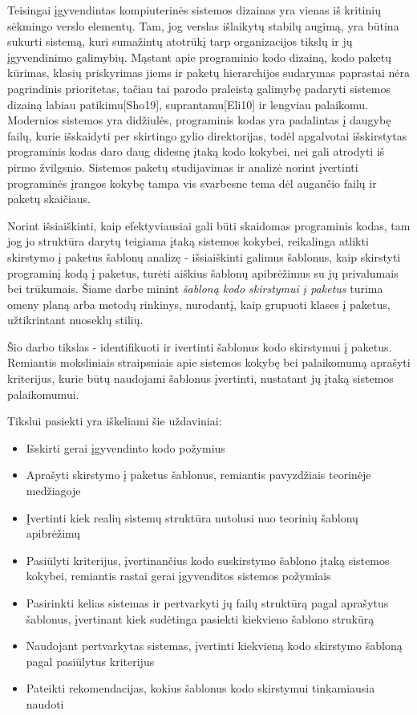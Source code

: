 Teisingai įgyvendintas kompiuterinės sistemos dizainas yra vienas iš kritinių sėkmingo verslo
elementų.
Tam, jog verslas išlaikytų stabilų augimą, yra būtina sukurti sistemą, kuri sumažintų
atotrūkį tarp organizacijos tikslų ir jų įgyvendinimo galimybių.
Mąstant apie programinio kodo
dizainą, kodo paketų kūrimas, klasių priskyrimas jiems ir paketų hierarchijos sudarymas paprastai
nėra pagrindinis prioritetas, tačiau tai parodo praleistą galimybę padaryti sistemos dizainą labiau
patikimu[Sho19], suprantamu[Eli10] ir lengviau palaikomu.
Modernios sistemos yra didžiulės, programinis kodas yra padalintas į daugybę failų,
kurie išskaidyti per skirtingo gylio direktorijas, todėl apgalvotai išskirstytas programinis
kodas daro daug didesnę įtaką kodo kokybei, nei gali atrodyti iš pirmo žvilgsnio.
Sistemos paketų studijavimas ir analizė norint įvertinti programinės įrangos kokybę
tampa vis svarbesne tema dėl augančio failų ir paketų skaičiaus\cite{DesignMetrics}.

Norint išsiaiškinti, kaip efektyviausiai gali būti skaidomas programinis
kodas, tam jog jo struktūra darytų teigiama įtaką sistemos kokybei, reikalinga atlikti skirstymo į paketus šablonų analizę -
išsiaiškinti galimus šablonus, kaip skirstyti programinį kodą į paketus, turėti aiškius šablonų apibrėžimus su jų
privalumais bei trūkumais.
Šiame darbe minint \textit{šabloną kodo skirstymui į paketus} turima omeny planą arba metodų rinkinys, nurodantį, kaip grupuoti klases į paketus, užtikrintant nuoseklų stilių.

Šio darbo tikslas - identifikuoti ir ivertinti šablonus kodo skirstymui į paketus.
Remiantis moksliniais straipsniais apie sistemos kokybę bei palaikomumą aprašyti kriterijus,
kurie būtų naudojami šablonus įvertinti, nustatant jų įtaką sistemos palaikomumui.

Tikslui pasiekti yra iškeliami šie uždaviniai:
\begin{itemize}
    \item Išskirti gerai įgyvendinto kodo požymius
    \item  Aprašyti skirstymo į paketus šablonus, remiantis pavyzdžiais teorinėje medžiagoje
    \item  Įvertinti kiek realių sistemų struktūra nutolusi nuo teorinių šablonų apibrėžimų
    \item  Pasiūlyti kriterijus, įvertinančius kodo suskirstymo šablono įtaką sistemos kokybei, remiantis
rastai gerai įgyvenditos sistemos požymiais
    \item  Pasirinkti kelias sistemas ir pertvarkyti jų failų struktūrą pagal aprašytus šablonus, įvertinant
kiek sudėtinga pasiekti kiekvieno šablono strukūrą
    \item  Naudojant pertvarkytas sistemas, įvertinti kiekvieną kodo skirstymo šabloną pagal pasiūlytus kriterijus
    \item  Pateikti rekomendacijas, kokius šablonus kodo skirstymui tinkamiausia naudoti
\end{itemize}

